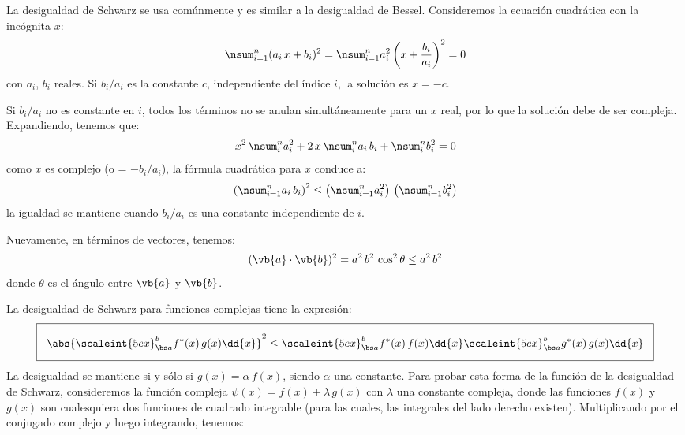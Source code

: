 La desigualdad de Schwarz se usa comúnmente y es similar a la desigualdad de Bessel. Consideremos la ecuación cuadrática con la incógnita $x$:
\begin{align}
\nsum_{i=1}^{n} (a_{i} \, x + b_{i})^{2} = \nsum_{i=1}^{n} a_{i}^{2} \left( x + \frac{b_{i}}{a_{i}} \right)^{2} = 0
\label{eq:ecuacion_10_74}
\end{align}
con $a_{i}$, $b_{i}$ reales. Si $b_{i}/a_{i}$ es la constante $c$, independiente del índice $i$, la solución es $x= - c$. 
\par
Si $b_{i}/a_{i}$ no es constante en $i$, todos los términos no se anulan simultáneamente para un $x$ real, por lo que la solución debe de ser compleja. Expandiendo, tenemos que:
\begin{align}
x^{2} \, \nsum_{i}^{n} a_{i}^{2} + 2 \, x \, \nsum_{i}^{n} a_{i} \, b_{i} + \nsum_{i}^{n} b_{i}^{2} = 0
\label{eq:ecuacion_10_75}
\end{align}
como $x$ es complejo (o = $-b_{i}/a_{i}$), la fórmula cuadrática para $x$ conduce a: 
\begin{align}
\left( \nsum_{i=1}^{n} a_{i} \, b_{i} \right)^{2} \leq \left( \nsum_{i=1}^{n} a_{i}^{2} \right) \, \left( \nsum_{i=1}^{n} b_{i}^{2} \right)
\label{eq:ecuacion_10_76}
\end{align}
la igualdad se mantiene cuando $b_{i}/a_{i}$ es una constante independiente de $i$.
\par
Nuevamente, en términos de vectores, tenemos:
\begin{align}
( \vb{a} \cdot \vb{b} )^{2} =  a^{2} \, b^{2} \, \cos^{2} \theta \leq a^{2} \, b^{2}
\label{eq:ecuacion_10_77}
\end{align}
donde $\theta$ es el ángulo entre $\vb{a}$ y $\vb{b}$.
\par
La desigualdad de Schwarz para funciones complejas tiene la expresión:
\begin{align}
\setlength{\fboxsep}{3\fboxsep}\boxed{
\abs{ \scaleint{5ex}_{\bs a}^{b} f^{*} (x) \, g(x) \dd{x} }^{2} \leq \scaleint{5ex}_{\bs a}^{b} f^{*}(x) \, f(x) \dd{x} \scaleint{5ex}_{\bs a}^{b} g^{*}(x) \, g(x) \dd{x}}
\label{eq:ecuacion_10_78}
\end{align}
La desigualdad se mantiene si y sólo si $g(x) = \alpha \, f(x)$, siendo $\alpha$ una constante. Para probar esta forma de la función de la desigualdad de Schwarz, consideremos la función compleja $\psi(x) = f(x) + \lambda \, g(x)$ con $\lambda$ una constante compleja, donde las funciones $f(x)$ y $g(x)$ son cualesquiera dos funciones de cuadrado integrable (para las cuales, las integrales del lado derecho existen). Multiplicando por el conjugado complejo y luego integrando, tenemos:
